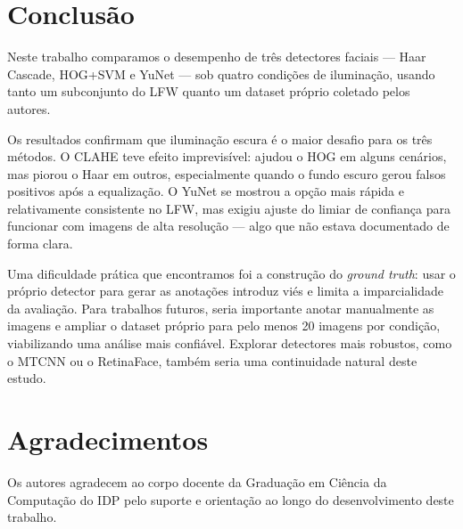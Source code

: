 \documentclass[conference]{IEEEtran}
\begin{document}
\section{Conclus\~ao}

Neste trabalho comparamos o desempenho de tr\^es detectores faciais --- Haar Cascade, HOG+SVM e YuNet --- sob quatro condi\c{c}\~oes de ilumina\c{c}\~ao, usando tanto um subconjunto do LFW quanto um dataset pr\'oprio coletado pelos autores.

Os resultados confirmam que ilumina\c{c}\~ao escura \'e o maior desafio para os tr\^es m\'etodos. O CLAHE teve efeito imprevis\'ivel: ajudou o HOG em alguns cen\'arios, mas piorou o Haar em outros, especialmente quando o fundo escuro gerou falsos positivos ap\'os a equaliza\c{c}\~ao. O YuNet se mostrou a op\c{c}\~ao mais r\'apida e relativamente consistente no LFW, mas exigiu ajuste do limiar de confian\c{c}a para funcionar com imagens de alta resolu\c{c}\~ao --- algo que n\~ao estava documentado de forma clara.

Uma dificuldade pr\'atica que encontramos foi a constru\c{c}\~ao do \textit{ground truth}: usar o pr\'oprio detector para gerar as anota\c{c}\~oes introduz vi\'es e limita a imparcialidade da avalia\c{c}\~ao. Para trabalhos futuros, seria importante anotar manualmente as imagens e ampliar o dataset pr\'oprio para pelo menos 20 imagens por condi\c{c}\~ao, viabilizando uma an\'alise mais confi\'avel. Explorar detectores mais robustos, como o MTCNN ou o RetinaFace, tamb\'em seria uma continuidade natural deste estudo.

\section*{Agradecimentos}
Os autores agradecem ao corpo docente da Gradua\c{c}\~ao em Ci\^encia da Computa\c{c}\~ao do IDP pelo suporte e orienta\c{c}\~ao ao longo do desenvolvimento deste trabalho.
\end{document}
